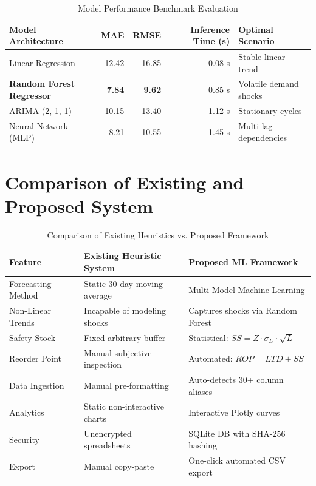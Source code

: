 \documentclass[12pt,a4paper]{report}
\begin{document}
\begin{table}[h!]
\centering
\caption{Model Performance Benchmark Evaluation}
\label{tab:results}
\begin{tabular}{lrrrl}
\toprule
\textbf{Model Architecture} & \textbf{MAE} & \textbf{RMSE} & \textbf{Inference Time (s)} & \textbf{Optimal Scenario} \\
\midrule
Linear Regression & 12.42 & 16.85 & 0.08 s & Stable linear trend \\
\textbf{Random Forest Regressor} & \textbf{7.84} & \textbf{9.62} & 0.85 s & Volatile demand shocks \\
ARIMA (2, 1, 1) & 10.15 & 13.40 & 1.12 s & Stationary cycles \\
Neural Network (MLP) & 8.21 & 10.55 & 1.45 s & Multi-lag dependencies \\
\bottomrule
\end{tabular}
\end{table}

\section{Comparison of Existing and Proposed System}
\begin{table}[h!]
\centering
\caption{Comparison of Existing Heuristics vs. Proposed Framework}
\label{tab:comparison}
\begin{tabular}{lll}
\toprule
\textbf{Feature} & \textbf{Existing Heuristic System} & \textbf{Proposed ML Framework} \\
\midrule
Forecasting Method & Static 30-day moving average & Multi-Model Machine Learning \\
Non-Linear Trends & Incapable of modeling shocks & Captures shocks via Random Forest \\
Safety Stock & Fixed arbitrary buffer & Statistical: $SS = Z \cdot \sigma_D \cdot \sqrt{L}$ \\
Reorder Point & Manual subjective inspection & Automated: $ROP = LTD + SS$ \\
Data Ingestion & Manual pre-formatting & Auto-detects 30+ column aliases \\
Analytics & Static non-interactive charts & Interactive Plotly curves \\
Security & Unencrypted spreadsheets & SQLite DB with SHA-256 hashing \\
Export & Manual copy-paste & One-click automated CSV export \\
\bottomrule
\end{tabular}
\end{table}
\end{document}
